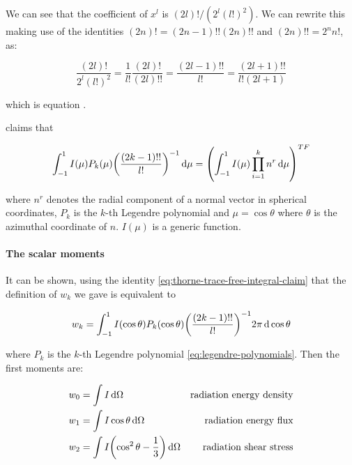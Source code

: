 \documentclass[main.tex]{subfiles}
\begin{document}
We can see that the coefficient of \(x^l\) is \((2l)! / (2^l (l!)^2)\). We can rewrite this making use of the identities \((2n)! = (2n-1)!! (2n)!!\) and \((2n)!! = 2^n n!\),  as:

\begin{equation}
    \frac{(2l)!}{2^l (l!)^2} = \frac{1}{l!} \frac{(2l)!}{(2l)!!} = \frac{(2l-1)!!}{l!} = \frac{(2l+1)!!}{l! (2l+1)}
\end{equation}

which is equation \cite[eq. 5.7d]{Thorne:1981feb}.

\textcite[eqs. 5.6]{Thorne:1981feb} claims that

\begin{equation} \label{eq:thorne-trace-free-integral-claim}
    \int_{-1}^1 I(\mu) P_k(\mu) \qty(\frac{(2k-1)!!}{l!})^{-1} \dd{\mu} = \qty(\int_{-1}^1  I(\mu) \prod_{i=1}^k n^r \dd{\mu})^{TF}
\end{equation}

where \(n^r\) denotes the radial component of a normal vector in spherical coordinates, \(P_k\) is the \(k\)-th Legendre polynomial and \(\mu = \cos \theta\) where \(\theta\) is the azimuthal coordinate of \(n\). \(I(\mu)\) is a generic function.

\paragraph{The scalar moments} \label{par:scalar-moments}

It can be shown, using the identity \eqref{eq:thorne-trace-free-integral-claim}  that the definition of \(w_k\) we gave is equivalent to

\begin{equation}
    w_k = \int_{-1}^1 I(\cos \theta) P_k(\cos \theta) \qty(\frac{(2k-1)!!}{l!})^{-1} 2 \pi\dd{\cos \theta}
\end{equation}

where \(P_k\) is the \(k\)-th Legendre polynomial \eqref{eq:legendre-polynomials}.
Then the first moments are:

\begin{subequations}
\begin{align}
  w_0 &= \int I \dd{\Omega} & \text{radiation energy density} \\
  w_1 &= \int I \cos \theta \dd{\Omega} & \text{radiation energy flux} \\
  w_2 &= \int I \qty(\cos^2 \theta - \frac{1}{3}) \dd{\Omega} & \text{radiation shear stress}
\end{align}
\end{subequations}
\end{document}
